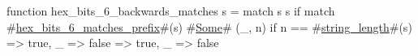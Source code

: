 function hex_bits_6_backwards_matches s = match s {
  s if match #\hyperref[sailRISCVzhexzybitszy6zymatcheszyprefix]{hex\_bits\_6\_matches\_prefix}#(s) {
    #\hyperref[sailRISCVzSome]{Some}# (_, n) if n == #\hyperref[sailRISCVzstringzylength]{string\_length}#(s) => true,
    _ => false
  } => true,
  _ => false
}
